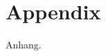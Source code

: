 \documentclass{Bericht}
\begin{document}

\newpage
\section{Appendix} %
	Anhang.
	
\vfill %

\printbibliography
\end{document}

